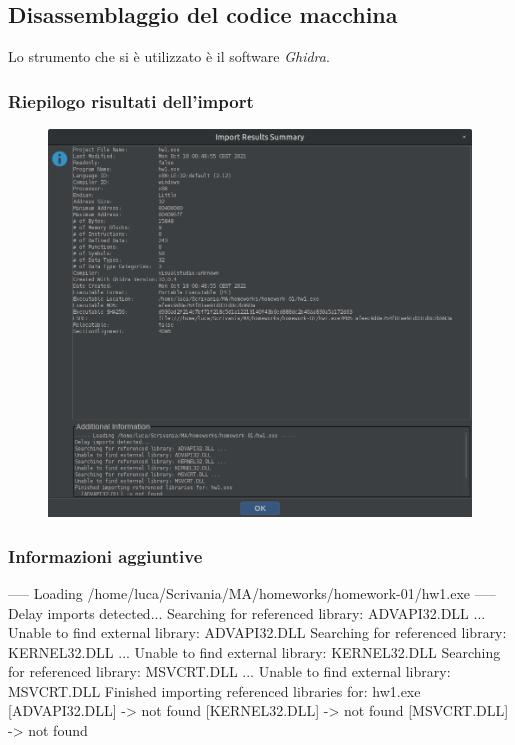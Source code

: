 \documentclass[a4paper, 12pt]{article}
\begin{document}
\subsection{Disassemblaggio del codice macchina}
Lo strumento che si è utilizzato è il software \emph{Ghidra}.

\subsubsection{Riepilogo risultati dell'import}
\begin{figure}[H]
\centering\includegraphics[width=\textwidth]{Import_Results_Summary}
\end{figure}

\subsubsection{Informazioni aggiuntive}
\begin{spverbatim}

----- Loading /home/luca/Scrivania/MA/homeworks/homework-01/hw1.exe ----- 
Delay imports detected... 
Searching for referenced library: ADVAPI32.DLL ... 
Unable to find external library: ADVAPI32.DLL 
Searching for referenced library: KERNEL32.DLL ... 
Unable to find external library: KERNEL32.DLL 
Searching for referenced library: MSVCRT.DLL ... 
Unable to find external library: MSVCRT.DLL 
Finished importing referenced libraries for: hw1.exe 
  [ADVAPI32.DLL] -> not found 
  [KERNEL32.DLL] -> not found 
  [MSVCRT.DLL] -> not found 
\end{spverbatim}
\end{document}
